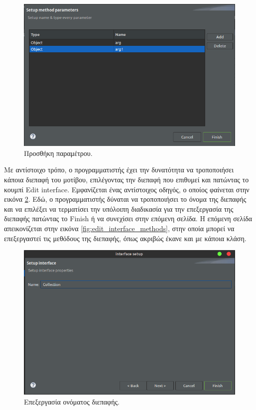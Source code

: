 \begin{figure}[H]
    \centering
    \includegraphics[width=1.0\textwidth]{Figures/add_parameters.png}
    \caption{Προσθήκη παραμέτρου.}
    \label{fig:add_parameters}
\end{figure}
Με αντίστοιχο τρόπο, ο προγραμματιστής έχει την δυνατότητα να τροποποιήσει κάποια διεπαφή του μοτίβου, 
επιλέγοντας την διεπαφή που επιθυμεί και πατώντας το κουμπί Edit interface. Εμφανίζεται ένας αντίστοιχος οδηγός, ο οποίος φαίνεται 
στην εικόνα \ref{fig:edit_interface}. Εδώ, ο προγραμματιστής δύναται να τροποποιήσει το όνομα της διεπαφής 
και να επιλέξει να τερματίσει την υπόλοιπη διαδικασία για την επεξεργασία της διεπαφής πατώντας το Finish ή να συνεχίσει στην επόμενη 
σελίδα. Η επόμενη σελίδα απεικονίζεται στην εικόνα \ref{fig:edit_interface_methods}, στην οποία μπορεί να 
επεξεργαστεί τις μεθόδους της διεπαφής, όπως ακριβώς έκανε και με κάποια κλάση.
\begin{figure}[H]
    \centering
    \includegraphics[width=1.0\textwidth]{Figures/edit_interface.png}
    \caption{Επεξεργασία ονόματος διεπαφής.}
    \label{fig:edit_interface}
\end{figure}
